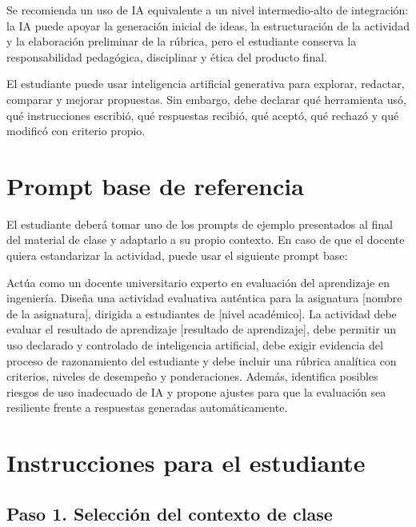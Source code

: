\documentclass[12pt,letterpaper]{article}
\begin{document}
Se recomienda un uso de IA equivalente a un nivel intermedio-alto de
integración: la IA puede apoyar la generación inicial de ideas, la
estructuración de la actividad y la elaboración preliminar de la
rúbrica, pero el estudiante conserva la responsabilidad pedagógica,
disciplinar y ética del producto final.

\begin{tcolorbox}[colback=gray!5,colframe=black,title=Regla de uso de IA]
  El estudiante puede usar inteligencia artificial generativa para
  explorar, redactar, comparar y mejorar propuestas. Sin embargo,
  debe declarar qué herramienta usó, qué instrucciones escribió, qué
  respuestas recibió, qué aceptó, qué rechazó y qué modificó con
  criterio propio.
\end{tcolorbox}

\section{Prompt base de referencia}

El estudiante deberá tomar uno de los prompts de ejemplo presentados
al final del material de clase y adaptarlo a su propio contexto. En
caso de que el docente quiera estandarizar la actividad, puede usar
el siguiente prompt base:

\begin{tcolorbox}[colback=gray!5,colframe=black,title=Prompt base sugerido]
  Actúa como un docente universitario experto en evaluación del
  aprendizaje en ingeniería. Diseña una actividad evaluativa
  auténtica para la asignatura [nombre de la asignatura], dirigida a
  estudiantes de [nivel académico]. La actividad debe evaluar el
  resultado de aprendizaje [resultado de aprendizaje], debe permitir
  un uso declarado y controlado de inteligencia artificial, debe
  exigir evidencia del proceso de razonamiento del estudiante y debe
  incluir una rúbrica analítica con criterios, niveles de desempeño y
  ponderaciones. Además, identifica posibles riesgos de uso
  inadecuado de IA y propone ajustes para que la evaluación sea
  resiliente frente a respuestas generadas automáticamente.
\end{tcolorbox}

\section{Instrucciones para el estudiante}

\subsection*{Paso 1. Selección del contexto de clase}
\end{document}
